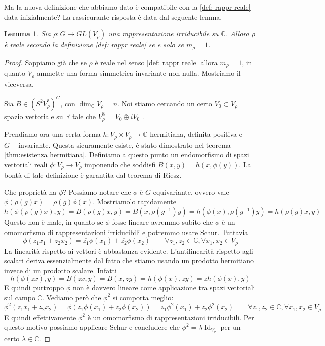 \documentclass[11pt]{article}
\theoremstyle{plain}
\newtheorem{lemma}[thm]{Lemma}
\theoremstyle{definition}
\theoremstyle{remark}
\newcommand{\C}{\mathbb{C}}
\newcommand{\R}{\mathbb{R}}
\DeclareMathOperator{\Id}{Id}
\begin{document}
Ma la nuova definizione che abbiamo dato è compatibile con la \ref{def: rappr reale} data inizialmente?
La rassicurante risposta è data dal seguente lemma.
\begin{lemma}
Sia $\rho:G\to GL(V_\rho)$ una rappresentazione irriducibile su $\C$. Allora $\rho$ è reale secondo la definizione \ref{def: rappr reale} se e solo se $m_\rho = 1$.
\end{lemma}
\begin{proof}
Sappiamo già che se $\rho$ è reale nel senso \ref{def: rappr reale} allora $m_\rho = 1$, in quanto $V_\rho$ ammette una forma simmetrica invariante non nulla. Mostriamo il viceversa.

Sia $B \in (S^2V_\rho^*)^G$, con $\dim_\C V_\rho = n$.
Noi stiamo cercando un certo $V_0 \subset V_\rho$ spazio vettoriale su $\R$ tale che $V_\rho^\R = V_0 \oplus i V_0$ .






Prendiamo ora una certa forma $h : V_\rho \times V_\rho \to \C$ hermitiana, definita positiva e $G-$invariante. Questa sicuramente esiste, è stato dimostrato nel teorema \ref{thm:esistenza hermitiana}.
Definiamo a questo punto un endomorfismo di spazi vettoriali reali $\phi: V_\rho \to V_\rho$ imponendo che soddisfi $B(x, y) = h(x, \phi(y))$.
La bontà di tale definizione è garantita dal teorema di Riesz.

Che proprietà ha $\phi$? Possiamo notare che $\phi$ è $G$-equivariante, ovvero vale $\phi(\rho(g)x) = \rho(g) \phi(x)$.
Mostriamolo rapidamente
\[ h(\phi(\rho(g)x) , y) = B(\rho(g)x, y) = B(x, \rho(g^{-1} ) y) = h (\phi(x), \rho(g^{-1} ) y) = h(\rho(g)x, y)\]
Questo non è male, in quanto se $\phi$ fosse lineare avremmo subito che $\phi$ è un omomorfismo di rappresentazioni irriducibili e potremmo usare Schur. Tuttavia
\[ \phi(z_1 x_1 + z_2 x_2) = \overline{z_1} \phi(x_1) + \overline{z_2} \phi(x_2) \qquad \forall z_1, z_2 \in \C, \forall x_1, x_2 \in V_\rho\]
La linearità rispetto ai vettori è abbastanza evidente. L'antilinearità rispetto agli scalari deriva essenzialmente dal fatto che stiamo usando un prodotto hermitiano invece di un prodotto scalare. Infatti
\[ h( \phi(zx) , y) = B(zx, y) = B(x, zy) = h(\phi(x), zy) = \overline{z} h(\phi(x), y) \]
E quindi purtroppo $\phi$ non è davvero lineare come applicazione tra spazi vettoriali sul campo $\C$. Vediamo però che $\phi^2$ si comporta meglio:
\[\phi^2(z_1 x_1 + z_2 x_2) = \phi(\overline{z_1} \phi(x_1) + \overline{z_2} \phi(x_2))  = z_1 \phi^2(x_1) + z_2 \phi^2(x_2) \qquad \forall z_1, z_2 \in \C, \forall x_1, x_2 \in V_\rho \] 
E quindi effettivamente $\phi^2$ è un omomorfismo di rappresentazioni irriducibili. Per questo motivo possiamo applicare Schur e concludere che 
$\phi^ 2 = \lambda \Id_{V_\rho}$ per un certo $\lambda \in \C$.


\end{proof}
\end{document}
